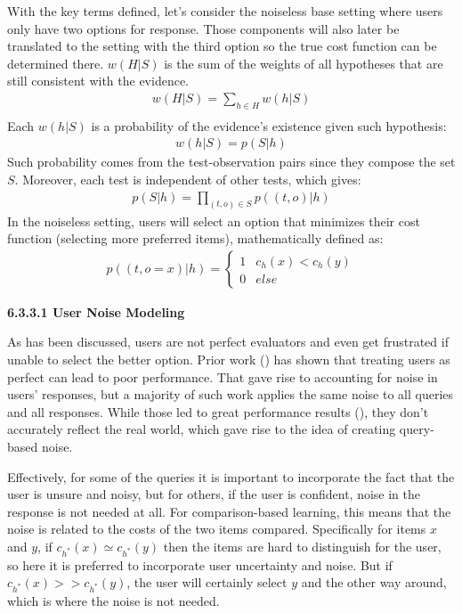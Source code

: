 \documentclass[
  letterpaper,
  DIV=11,
  numbers=noendperiod,
  oneside]{scrreprt}
\theoremstyle{remark}
\begin{document}
With the key terms defined, let's consider the noiseless base setting
where users only have two options for response. Those components will
also later be translated to the setting with the third option so the
true cost function can be determined there. \(w(H|S)\) is the sum of the
weights of all hypotheses that are still consistent with the evidence.
\[\begin{aligned}
    w(H|S) = \sum_{h \in H} w(h | S)\\
\end{aligned}\] Each \(w(h|S)\) is a probability of the evidence's
existence given such hypothesis: \[\begin{aligned}
    w(h|S) = p(S|h)
\end{aligned}\] Such probability comes from the test-observation pairs
since they compose the set \(S\). Moreover, each test is independent of
other tests, which gives: \[\begin{aligned}
    p(S|h) = \prod_{(t,o) \in S} p((t,o) | h)
\end{aligned}\] In the noiseless setting, users will select an option
that minimizes their cost function (selecting more preferred items),
mathematically defined as: \[\begin{aligned}
    p((t, o = x) | h) = 
    \begin{cases}
        1 & c_h(x) < c_h(y)\\
        0 & else
    \end{cases}
    \label{eq:prob_base}
\end{aligned}\]

\textbf{6.3.3.1 User Noise Modeling}

As has been discussed, users are not perfect evaluators and even get
frustrated if unable to select the better option. Prior work
() has shown that
treating users as perfect can lead to poor performance. That gave rise
to accounting for noise in users' responses, but a majority of such work
applies the same noise to all queries and all responses. While those led
to great performance results (), they don't accurately reflect the real world, which gave
rise to the idea of creating query-based noise.

Effectively, for some of the queries it is important to incorporate the
fact that the user is unsure and noisy, but for others, if the user is
confident, noise in the response is not needed at all. For
comparison-based learning, this means that the noise is related to the
costs of the two items compared. Specifically for items \(x\) and \(y\),
if \(c_{h^*}(x) \simeq c_{h^*}(y)\) then the items are hard to
distinguish for the user, so here it is preferred to incorporate user
uncertainty and noise. But if \(c_{h^*}(x) >> c_{h^*}(y)\), the user
will certainly select \(y\) and the other way around, which is where the
noise is not needed.
\end{document}
